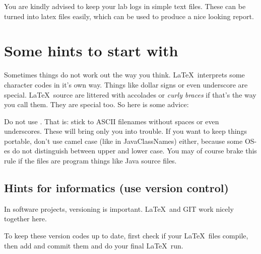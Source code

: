 You are kindly advised to keep your lab logs in simple text
files. These can be turned into latex files easily,
which can be used to produce a nice looking report.
\section{Some hints to start with}
Sometimes things do not work out the way you think.
\LaTeX\ interprets some character codes in it's own way.
Things like dollar signs or even underscore are special.
\LaTeX\ source are littered with accolades or \textit{curly braces} if that's
the way you call them. They are special too. So here is some advice: 

Do not use . That is: stick to ASCII filenames without spaces or even underscores. 
These will bring only you into trouble. If you want to keep things portable, 
don't use camel case (like in JavaClassNames) either, because
some OS-es do not distinguish between upper and lower case. You may of
course brake this rule if the files are program things like
Java source files.

\subsection{Hints for informatics (use version control)}
In software projects, versioning is important. \LaTeX\ and \textsc{GIT}
work nicely together here.


To keep these version codes up to date, first check if your \LaTeX\  files compile,
then add and commit them and do your final \LaTeX\  run. 



